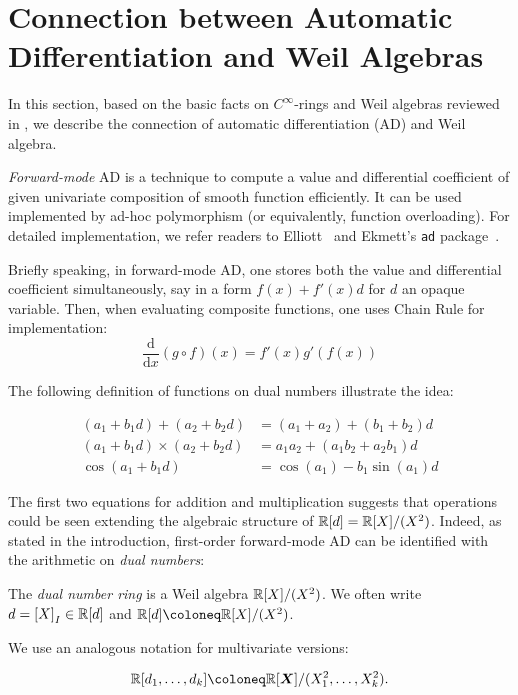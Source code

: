 \documentclass[%
  sigconf,authorversion,screen]{acmart}
\begin{document}
\section{Connection between Automatic Differentiation and Weil Algebras}
\label{sec:ad-and-weils}
In this section, based on the basic facts on $C^\infty$-rings and Weil algebras reviewed in , we describe the connection of automatic differentiation (AD) and Weil algebra.

\emph{Forward-mode} AD is a technique to compute a value and differential coefficient of given univariate composition of smooth function efficiently.
It can be used implemented by ad-hoc polymorphism (or equivalently, function overloading).
For detailed implementation, we refer readers to Elliott~\cite{Elliott2009-beautiful-differentiation} and Ekmett's \texttt{ad} package~\cite{Kmett:2010aa}.

Briefly speaking, in forward-mode AD, one stores both the value and differential coefficient simultaneously, say in a form $f(x) + f'(x) d$ for $d$ an opaque variable.
Then, when evaluating composite functions, one uses Chain Rule for implementation:
\[
  \frac{\mathrm{d}}{\mathrm{d}x}(g \circ f)(x) = f'(x) g'(f(x))
\]

The following definition of functions on dual numbers illustrate the idea:

\begin{align*}
  (a_1 + b_1 d) + (a_2 + b_2 d) &= (a_1 + a_2) + (b_1 + b_2)d\\
  (a_1 + b_1 d) \times (a_2 + b_2 d) &= a_1 a_2 + (a_1 b_2 + a_2 b_1)d\\
  \cos(a_1 + b_1 d) &= \cos(a_1) - b_1 \sin(a_1) d
\end{align*}

The first two equations for addition and multiplication suggests that operations could be seen extending the algebraic structure of $\mathbb{R}[d] = \mathbb{R}[X]/(X^2)$.
Indeed, as stated in the introduction, first-order forward-mode AD can be identified with the arithmetic on \emph{dual numbers}:
\begin{definition}
  The \emph{dual number ring} is a Weil algebra $\mathbb{R}[X]/(X^2)$.
  We often write $d = {[X]}_I \in \mathbb{R}[d]$ and $\R[d] \coloneq \R[X]/(X^2)$.

  We use an analogous notation for multivariate versions:
  
  \[
    \R[d_1, \dots, d_k] \coloneq \R[\X]/(X_1^2, \dots, X_k^2).
  \]
\end{definition}
\end{document}
